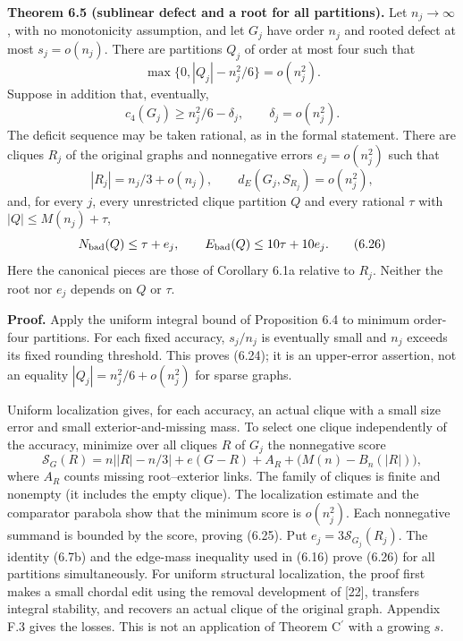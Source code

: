 \documentclass[english,11pt,a4paper]{article}
\newcounter{none}
\begin{document}

\textbf{Theorem 6.5 (sublinear defect and a root for all partitions).} Let \(n_j\to\infty\), with no monotonicity assumption, and let \(G_j\) have order \(n_j\) and rooted defect at most \(s_j=o(n_j)\). There are partitions \(Q_j\) of order at most four such that \[
\max\{0,|Q_j|-n_j^2/6\}=o(n_j^2).
\tag{6.24}
\] Suppose in addition that, eventually, \[
c_4(G_j)\ge n_j^2/6-\delta_j,\qquad \delta_j=o(n_j^2).
\] The deficit sequence may be taken rational, as in the formal statement. There are cliques \(R_j\) of the original graphs and nonnegative errors \(e_j=o(n_j^2)\) such that \[
|R_j|=n_j/3+o(n_j),\qquad
d_E(G_j,S_{R_j})=o(n_j^2),
\tag{6.25}
\] and, for every \(j\), every unrestricted clique partition \(Q\) and every rational \(\tau\) with \(|Q|\le M(n_j)+\tau\), \[
N_{\rm bad}(Q)\le\tau+e_j,\qquad
E_{\rm bad}(Q)\le10\tau+10e_j.
\tag{6.26}
\] Here the canonical pieces are those of Corollary 6.1a relative to \(R_j\). Neither the root nor \(e_j\) depends on \(Q\) or \(\tau\).

\textbf{Proof.} Apply the uniform integral bound of Proposition 6.4 to minimum order-four partitions. For each fixed accuracy, \(s_j/n_j\) is eventually small and \(n_j\) exceeds its fixed rounding threshold. This proves (6.24); it is an upper-error assertion, not an equality \(|Q_j|=n_j^2/6+o(n_j^2)\) for sparse graphs.

Uniform localization gives, for each accuracy, an actual clique with a small size error and small exterior-and-missing mass. To select one clique independently of the accuracy, minimize over all cliques \(R\) of \(G_j\) the nonnegative score \[
\mathcal S_G(R)=n\bigl||R|-n/3\bigr|
 +e(G-R)+A_R+\bigl(M(n)-B_n(|R|)\bigr),
\tag{6.27}
\] where \(A_R\) counts missing root--exterior links. The family of cliques is finite and nonempty (it includes the empty clique). The localization estimate and the comparator parabola show that the minimum score is \(o(n_j^2)\). Each nonnegative summand is bounded by the score, proving (6.25). Put \(e_j=3\mathcal S_{G_j}(R_j)\). The identity (6.7b) and the edge-mass inequality used in (6.16) prove (6.26) for all partitions simultaneously. For uniform structural localization, the proof first makes a small chordal edit using the removal development of {[}22{]}, transfers integral stability, and recovers an actual clique of the original graph. Appendix F.3 gives the losses. This is not an application of Theorem \texorpdfstring{C\ensuremath{^{\prime}}}{C'} with a growing \(s\).
\end{document}
